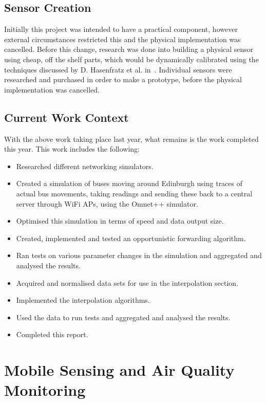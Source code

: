     \subsection{Sensor Creation}

        Initially this project was intended to have a practical component, however external circumstances restricted this and the physical implementation was cancelled. Before this change, research was done into building a physical sensor using cheap, off the shelf parts, which would be dynamically calibrated using the techniques discussed by D. Hasenfratz et al. in~\cite{ontheflycalibration}. Individual sensors were researched and purchased in order to make a prototype, before the physical implementation was cancelled. 

    \subsection{Current Work Context}

        With the above work taking place last year, what remains is the work completed this year. This work includes the following:

        \begin{itemize}
            \item Researched different networking simulators.
            \item Created a simulation of buses moving around Edinburgh using traces of actual bus movements, taking readings and sending these back to a central server through WiFi APs, using the Omnet++ simulator.
            \item Optimised this simulation in terms of speed and data output size.
            \item Created, implemented and tested an opportunistic forwarding algorithm.
            \item Ran tests on various parameter changes in the simulation and aggregated and analysed the results.
            \item Acquired and normalised data sets for use in the interpolation section.
            \item Implemented the interpolation algorithms.
            \item Used the data to run tests and aggregated and analysed the results.
            \item Completed this report.
        \end{itemize}
    

\section{Mobile Sensing and Air Quality Monitoring}\label{background_mobile_sensing_models}

